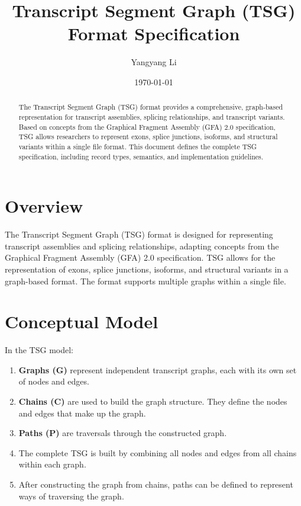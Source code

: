 \documentclass[11pt,a4paper]{article}
\title{\textbf{Transcript Segment Graph (TSG)\\Format Specification}}
\author{Yangyang Li}
\date{\today}
\begin{document}
\maketitle

\begin{abstract}
	The Transcript Segment Graph (TSG) format provides a comprehensive, graph-based representation for transcript assemblies, splicing relationships, and transcript variants. Based on concepts from the Graphical Fragment Assembly (GFA) 2.0 specification, TSG allows researchers to represent exons, splice junctions, isoforms, and structural variants within a single file format. This document defines the complete TSG specification, including record types, semantics, and implementation guidelines.
\end{abstract}

\tableofcontents
\newpage

\section{Overview}

The Transcript Segment Graph (TSG) format is designed for representing transcript assemblies and splicing relationships, adapting concepts from the Graphical Fragment Assembly (GFA) 2.0 specification.
TSG allows for the representation of exons, splice junctions, isoforms, and structural variants in a graph-based format. The format supports multiple graphs within a single file.

\section{Conceptual Model}

In the TSG model:

\begin{enumerate}[leftmargin=*]
	\item \textbf{Graphs (G)} represent independent transcript graphs, each with its own set of nodes and edges.
	\item \textbf{Chains (C)} are used to build the graph structure. They define the nodes and edges that make up the graph.
	\item \textbf{Paths (P)} are traversals through the constructed graph.
	\item The complete TSG is built by combining all nodes and edges from all chains within each graph.
	\item After constructing the graph from chains, paths can be defined to represent ways of traversing the graph.
\end{enumerate}
\end{document}
